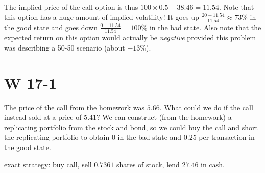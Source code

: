 \documentclass[12pt, letterpaper]{article}
\begin{document}
    The implied price of the call option is thus \(100 \times 0.5 - 38.46 = 11.54\). Note that this option has a huge amount of implied volatility! It goes up \(\frac{20 - 11.54}{11.54} \approx 73 \%\) in the good state and goes down \(\frac{0 - 11.54}{11.54} = 100\%\) in the bad state. Also note that the expected return on this option would actually be \emph{negative} provided this problem was describing a 50-50 scenario (about \(-13\%\)).

    \section{W 17-1}

    The price of the call from the homework was \(5.66\). What could we do if the call instead sold at a price of \(5.41\)? We can construct (from the homework) a replicating portfolio from the stock and bond, so we could buy the call and short the replicating portfolio to obtain \(0\) in the bad state and \(0.25\) per transaction in the good state.

    exact strategy: buy call, sell \(0.7361\) shares of stock, lend \(27.46\) in cash.
\end{document}
